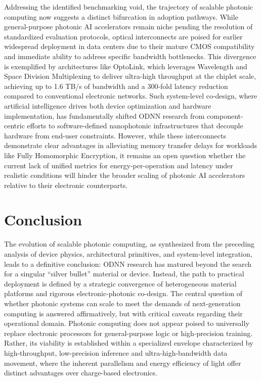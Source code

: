 \documentclass[11pt]{article}
\begin{document}
Addressing the identified benchmarking void, the trajectory of scalable photonic computing now suggests a distinct bifurcation in adoption pathways. While general-purpose photonic AI accelerators remain niche pending the resolution of standardized evaluation protocols, optical interconnects are poised for earlier widespread deployment in data centers due to their mature CMOS compatibility and immediate ability to address specific bandwidth bottlenecks. This divergence is exemplified by architectures like OptoLink, which leverages Wavelength and Space Division Multiplexing to deliver ultra-high throughput at the chiplet scale, achieving up to 1.6 TB/s of bandwidth and a 300-fold latency reduction compared to conventional electronic networks. Such system-level co-design, where artificial intelligence drives both device optimization and hardware implementation, has fundamentally shifted ODNN research from component-centric efforts to software-defined nanophotonic infrastructures that decouple hardware from end-user constraints. However, while these interconnects demonstrate clear advantages in alleviating memory transfer delays for workloads like Fully Homomorphic Encryption, it remains an open question whether the current lack of unified metrics for energy-per-operation and latency under realistic conditions will hinder the broader scaling of photonic AI accelerators relative to their electronic counterparts. \citep{doi_10_1145_3806395_315ab915} \citep{doi_10_1016_j_pquantelec_2023_100469_e4974ca6}

\section{Conclusion}\label{conclusion}

The evolution of scalable photonic computing, as synthesized from the preceding analysis of device physics, architectural primitives, and system-level integration, leads to a definitive conclusion: ODNN research has matured beyond the search for a singular ``silver bullet'' material or device. Instead, the path to practical deployment is defined by a strategic convergence of heterogeneous material platforms and rigorous electronic-photonic co-design. The central question of whether photonic systems can scale to meet the demands of next-generation computing is answered affirmatively, but with critical caveats regarding their operational domain. Photonic computing does not appear poised to universally replace electronic processors for general-purpose logic or high-precision training. Rather, its viability is established within a specialized envelope characterized by high-throughput, low-precision inference and ultra-high-bandwidth data movement, where the inherent parallelism and energy efficiency of light offer distinct advantages over charge-based electronics.
\end{document}
